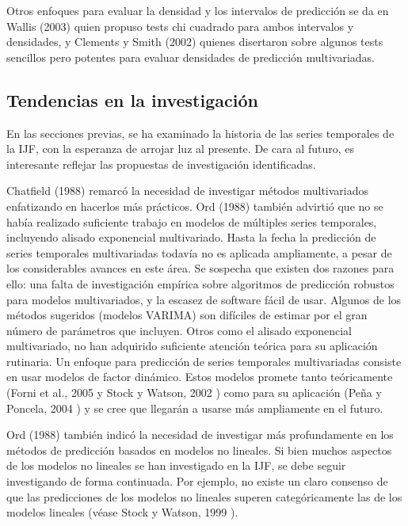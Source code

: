 \documentclass{llncs}
\begin{document}
Otros enfoques para evaluar la densidad y los intervalos de predicción se da en Wallis (2003) \cite{Wallis2003165} quien propuso tests chi cuadrado para ambos intervalos y densidades, y Clements y Smith (2002) quienes disertaron sobre algunos tests sencillos pero potentes para evaluar densidades de predicción multivariadas.

\subsection{Tendencias en la investigación}
En las secciones previas, se ha examinado la historia de las series temporales de la IJF, con la esperanza de arrojar luz al presente. De cara al futuro, es interesante reflejar las propuestas de investigación identificadas. 

Chatfield (1988) \cite{Chatfield198819} remarcó la necesidad de investigar métodos multivariados enfatizando en hacerlos más prácticos. Ord (1988) \cite{Ord1988389} también advirtió que no se había realizado suficiente trabajo en modelos de múltiples series temporales, incluyendo alisado exponencial multivariado. Hasta la fecha la predicción de series temporales multivariadas todavía no es aplicada ampliamente, a pesar  de los considerables avances en este área. Se sospecha que existen dos razones para ello: una falta de investigación empírica sobre algoritmos de predicción robustos para modelos multivariados, y la escasez de software fácil de usar. Algunos de los métodos sugeridos (modelos VARIMA) son difíciles de estimar por el gran número de parámetros que incluyen. Otros como el alisado exponencial multivariado, no han adquirido suficiente atención teórica para su aplicación rutinaria. Un enfoque para predicción de series temporales multivariadas consiste en usar modelos de factor dinámico. Estos modelos promete tanto teóricamente (Forni et al., 2005 \cite{Forni2005830} y Stock y Watson, 2002 \cite{Stock20021167}) como para su aplicación (Peña y Poncela, 2004 \cite{Pena2004291}) y se cree que llegarán a usarse más ampliamente en el futuro.

Ord (1988) \cite{Ord1988389} también indicó la necesidad de investigar más profundamente en los métodos de predicción basados en modelos no lineales. Si bien muchos aspectos de los modelos no lineales se han investigado en la IJF, se debe seguir investigando de forma continuada. Por ejemplo, no existe un claro consenso de que las predicciones de los modelos no lineales superen categóricamente las de los modelos lineales (véase Stock y Watson, 1999 \cite{Stock19991}). 
\end{document}
